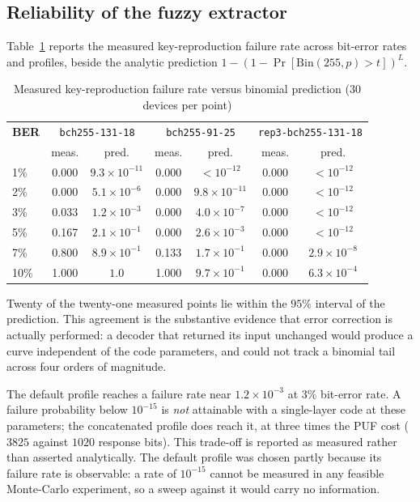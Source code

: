 \documentclass[11pt,a4paper]{article}
\begin{document}
\subsection{Reliability of the fuzzy extractor}
\label{subsec:reliability}

Table~\ref{tab:noise} reports the measured key-reproduction failure rate across
bit-error rates and profiles, beside the analytic prediction
$1-(1-\Pr[\mathrm{Bin}(255,p)>t])^{L}$.

\begin{table}[H]
\centering
\caption{Measured key-reproduction failure rate versus binomial prediction
(30 devices per point)}
\label{tab:noise}
\small
\begin{tabular}{@{}lcccccc@{}}
\toprule
\textbf{BER} & \multicolumn{2}{c}{\texttt{bch255-131-18}} &
\multicolumn{2}{c}{\texttt{bch255-91-25}} &
\multicolumn{2}{c}{\texttt{rep3-bch255-131-18}} \\
& meas. & pred. & meas. & pred. & meas. & pred. \\
\midrule
1\%  & 0.000 & $9.3\times10^{-11}$ & 0.000 & $<10^{-12}$ & 0.000 & $<10^{-12}$ \\
2\%  & 0.000 & $5.1\times10^{-6}$  & 0.000 & $9.8\times10^{-11}$ & 0.000 & $<10^{-12}$ \\
3\%  & 0.033 & $1.2\times10^{-3}$  & 0.000 & $4.0\times10^{-7}$ & 0.000 & $<10^{-12}$ \\
5\%  & 0.167 & $2.1\times10^{-1}$  & 0.000 & $2.6\times10^{-3}$ & 0.000 & $<10^{-12}$ \\
7\%  & 0.800 & $8.9\times10^{-1}$  & 0.133 & $1.7\times10^{-1}$ & 0.000 & $2.9\times10^{-8}$ \\
10\% & 1.000 & $1.0$               & 1.000 & $9.7\times10^{-1}$ & 0.000 & $6.3\times10^{-4}$ \\
\bottomrule
\end{tabular}
\end{table}

Twenty of the twenty-one measured points lie within the $95\%$ interval of the
prediction. This agreement is the substantive evidence that error correction is
actually performed: a decoder that returned its input unchanged would produce a
curve independent of the code parameters, and could not track a binomial tail
across four orders of magnitude.

The default profile reaches a failure rate near $1.2\times10^{-3}$ at $3\%$
bit-error rate. A failure probability below $10^{-15}$ is \emph{not} attainable
with a single-layer code at these parameters; the concatenated profile does reach
it, at three times the PUF cost ($3825$ against $1020$ response bits). This
trade-off is reported as measured rather than asserted analytically. The default
profile was chosen partly because its failure rate is observable: a rate of
$10^{-15}$ cannot be measured in any feasible Monte-Carlo experiment, so a sweep
against it would carry no information.
\end{document}
